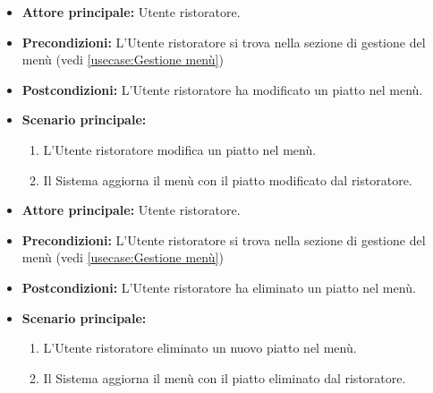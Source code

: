 \label{usecase:Modifica piatto}
\begin{itemize}

	\item \textbf{Attore principale:} Utente ristoratore.

	\item \textbf{Precondizioni:} L'Utente ristoratore si trova nella sezione di gestione del menù (vedi \autoref{usecase:Gestione menù})

	\item \textbf{Postcondizioni:} L'Utente ristoratore ha modificato un piatto nel menù.

	\item \textbf{Scenario principale:}
	\begin{enumerate}
		\item L'Utente ristoratore modifica un piatto nel menù.
		\item Il Sistema aggiorna il menù con il piatto modificato dal ristoratore.
	\end{enumerate}

\end{itemize}


\label{usecase:Elimina piatto}
\begin{itemize}

	\item \textbf{Attore principale:} Utente ristoratore.

	\item \textbf{Precondizioni:} L'Utente ristoratore si trova nella sezione di gestione del menù (vedi \autoref{usecase:Gestione menù})

	\item \textbf{Postcondizioni:} L'Utente ristoratore ha eliminato un piatto nel menù.

	\item \textbf{Scenario principale:}
	\begin{enumerate}
		\item L'Utente ristoratore eliminato un nuovo piatto nel menù.
		\item Il Sistema aggiorna il menù con il piatto eliminato dal ristoratore.
	\end{enumerate}

\end{itemize}
